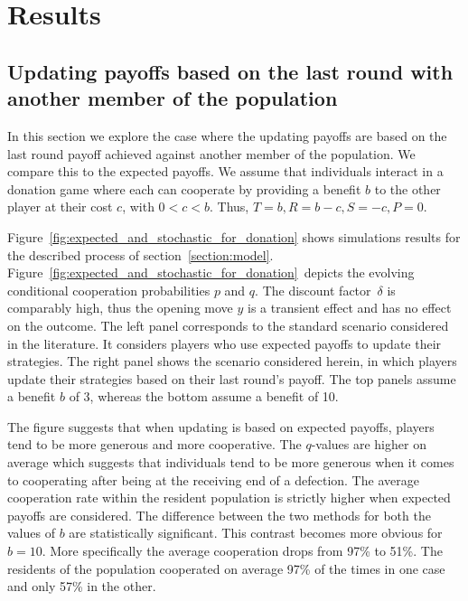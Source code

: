 \documentclass[11pt]{article}
\theoremstyle{plainCl1}
\theoremstyle{plainCl2}
\begin{document}
\section{Results}\label{section:results}
\subsection{Updating payoffs based on the last round with another member of the population}\label{section:donation}

In this section we explore the case where the updating payoffs are based on the
last round payoff achieved against another member of the population. We compare
this to the expected payoffs. We assume that individuals interact in a donation
game  where each can cooperate by providing a benefit \(b\) to the other
player at their cost \(c\), with \(0 < c < b\). Thus, \(T=b, R=b-c, S=-c, P=0\).

Figure~\ref{fig:expected_and_stochastic_for_donation} shows simulations results
for the described process of section~\ref{section:model}.
Figure~\ref{fig:expected_and_stochastic_for_donation}~depicts the evolving
conditional cooperation probabilities $p$ and $q$. The discount factor~$\delta$
is comparably high, thus the opening move \(y\) is a transient
effect and has no effect on the outcome. The left panel corresponds to the
standard scenario considered in the literature. It considers players who use
expected payoffs to update their strategies. The right panel shows the scenario
considered herein, in which players update their strategies based on their last
round’s payoff. The top panels assume a benefit \(b\) of 3, whereas the bottom
assume a benefit of 10.

The figure suggests that when updating is based on expected payoffs, players
tend to be more generous and more cooperative. The $q$-values are higher on
average which suggests that individuals tend to be more generous when it comes
to cooperating after being at the receiving end of a defection. %
The average cooperation rate within the resident population is strictly higher
when expected payoffs are considered. The difference between the two methods for
both the values of \(b\) are statistically significant. This contrast becomes
more obvious for \(b=10\). More specifically the average cooperation drops from
97\% to 51\%. The residents of the population cooperated on average 97\% of the
times in one case and only 57\% in the other.
\end{document}
